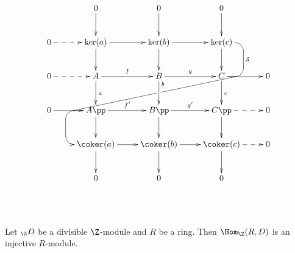 \[
  \xymatrix@!R{
                & 0                  & 0                  & 0                      \\
0 \ar@{-->}[r]  & {\ker(a)} \ar[r]   & {\ker(b)} \ar[r]   & {\ker(c)}
                \ar@{-}`r[d]`[d]^\delta[d] %
                                                                               & \\
0 \ar@{-->}[r]  & A    \ar[r]^{f}    & B  \ar[r]^{g}      & C \ar[r]
                 \ar@{}+<0.6cm,0cm>="p1"  %
                                                                               & 0 \\
0 \ar[r]        & A\pp \ar[r]^{f'}
                 \ar@{}[l]+<1cm,0cm>="p2" %
                 \ar`_l[l]+<1.03cm,0cm>`[d]`[d][d] %
                               & B\pp \ar[r]^{g'}   & C\pp \ar@{-->}[r]        & 0 \\
          & {\coker(a)} \ar[r] & {\coker(b)} \ar[r] & {\coker(c)} \ar@{-->}[r] & 0 \\
          & 0                  & 0                  & 0                            \\
\ar"1,2";"2,2"   \ar"1,3";"2,3"     \ar"1,4";"2,4"
\ar"2,2";"3,2"   \ar"2,3";"3,3"     \ar"2,4";"3,4"
\ar"3,2";"4,2"^a \ar"3,3";"4,3"^<<b \ar"3,4";"4,4"^c
\ar"4,2";"5,2"   \ar"4,3";"5,3"     \ar"4,4";"5,4"
\ar"5,2";"6,2"   \ar"5,3";"6,3"     \ar"5,4";"6,4"
\ar@{-}"p1";"p2"|!{"2,3";"3,3"}\hole
}
\]

\begin{thm}
Let $_\Z D$ be a divisible $\Z$-module and $R$ be a ring. Then $\Hom_\Z(R,D)$ is an injective $R$-module. 
\end{thm}


































